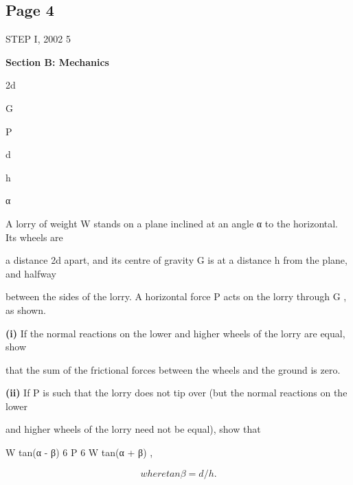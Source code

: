 \documentclass[12pt]{article}
\begin{document}
\subsection*{Page 4}
\begin{flushleft}
STEP I, 2002 5\par
\bigskip\textbf{Section B: Mechanics}\par
2d\par
G\par
P\par
d\par
h\par
α\par
A lorry of weight W stands on a plane inclined at an angle α to the horizontal. Its wheels are\par
a distance 2d apart, and its centre of gravity G is at a distance h from the plane, and halfway\par
between the sides of the lorry. A horizontal force P acts on the lorry through G , as shown.\par
\textbf{(i)} If the normal reactions on the lower and higher wheels of the lorry are equal, show\par
that the sum of the frictional forces between the wheels and the ground is zero.\par
\textbf{(ii)} If P is such that the lorry does not tip over (but the normal reactions on the lower\par
and higher wheels of the lorry need not be equal), show that\par
W tan(α - β) 6 P 6 W tan(α + β) ,\par
\[where tan β = d/h .\]
\end{flushleft}
\end{document}
